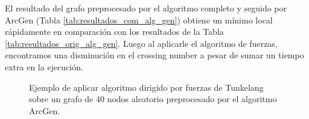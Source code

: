 El resultado del grafo preprocesado por el algoritmo completo y seguido por ArcGen (Tabla \ref{tab:resultados_com_alg_gen}) obtiene un mínimo local rápidamente en comparación con los resultados de la Tabla  \ref{tab:resultados_orig_alg_gen}. Luego al aplicarle el algoritmo de fuerzas, encontramos una disminución en el crossing number a pesar de sumar un tiempo extra en la ejecución.

\begin{figure}
	\centering
	\caption{Ejemplo de aplicar algoritmo dirigido por fuerzas de Tunkelang sobre un grafo de 40 nodos aleatorio preprocesado por el algoritmo ArcGen.}
	\label{fig:resultado_ejemplo_grafo_ori_gen_fue}
\end{figure}

